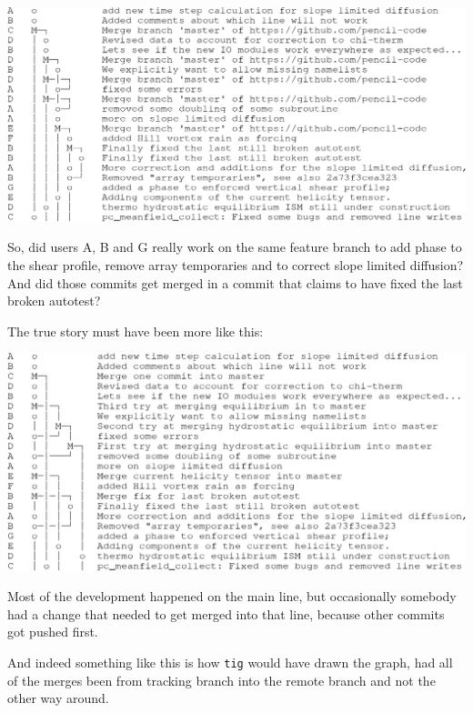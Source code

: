 \documentclass[12pt,pdftex]{article}
\begin{document}
\includegraphics[width=.97\linewidth]{git-wrong-history.pdf}

So, did users A, B and G really work on the same feature branch to add
phase to the shear profile, remove array temporaries and to correct
slope limited diffusion?
And did those commits get merged in a commit that claims to have fixed
the last broken autotest?

The true story must have been more like this:

\includegraphics[width=.97\linewidth]{git-better-history.pdf}

Most of the development happened on the main line, but occasionally
somebody had a change that needed to get merged into that line, because
other commits got pushed first.

And indeed something like this is how \texttt{tig} would have drawn the graph,
had all of the merges been from tracking branch into the remote branch
and not the other way around.
\end{document}
